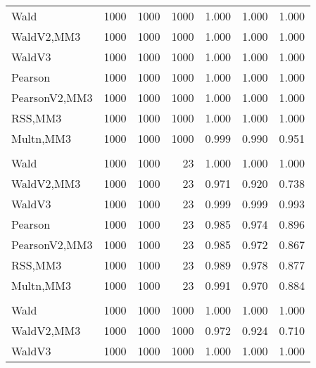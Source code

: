 \documentclass[
]{article}
\begin{document}
\begin{table}[H]
{\begin{tabular}[t]{lrrrrrr}
\hspace{1em}Wald & 1000 & 1000 & 1000 & 1.000 & 1.000 & \vphantom{1} 1.000\\
\hspace{1em}WaldV2,MM3 & 1000 & 1000 & 1000 & 1.000 & 1.000 & 1.000\\
\hspace{1em}WaldV3 & 1000 & 1000 & 1000 & 1.000 & 1.000 & \vphantom{1} 1.000\\
\hspace{1em}Pearson & 1000 & 1000 & 1000 & 1.000 & 1.000 & 1.000\\
\hspace{1em}PearsonV2,MM3 & 1000 & 1000 & 1000 & 1.000 & 1.000 & 1.000\\
\hspace{1em}RSS,MM3 & 1000 & 1000 & 1000 & 1.000 & 1.000 & 1.000\\
\hspace{1em}Multn,MM3 & 1000 & 1000 & 1000 & 0.999 & 0.990 & 0.951\\
\addlinespace[0.3em]
\multicolumn{7}{l}{\textbf{2F 10V}}\\
\hspace{1em}Wald & 1000 & 1000 & 23 & 1.000 & 1.000 & 1.000\\
\hspace{1em}WaldV2,MM3 & 1000 & 1000 & 23 & 0.971 & 0.920 & 0.738\\
\hspace{1em}WaldV3 & 1000 & 1000 & 23 & 0.999 & 0.999 & 0.993\\
\hspace{1em}Pearson & 1000 & 1000 & 23 & 0.985 & 0.974 & 0.896\\
\hspace{1em}PearsonV2,MM3 & 1000 & 1000 & 23 & 0.985 & 0.972 & 0.867\\
\hspace{1em}RSS,MM3 & 1000 & 1000 & 23 & 0.989 & 0.978 & 0.877\\
\hspace{1em}Multn,MM3 & 1000 & 1000 & 23 & 0.991 & 0.970 & 0.884\\
\addlinespace[0.3em]
\multicolumn{7}{l}{\textbf{3F 15V}}\\
\hspace{1em}Wald & 1000 & 1000 & 1000 & 1.000 & 1.000 & 1.000\\
\hspace{1em}WaldV2,MM3 & 1000 & 1000 & 1000 & 0.972 & 0.924 & 0.710\\
\hspace{1em}WaldV3 & 1000 & 1000 & 1000 & 1.000 & 1.000 & 1.000\\

\end{tabular}}
\end{table}
\end{document}
